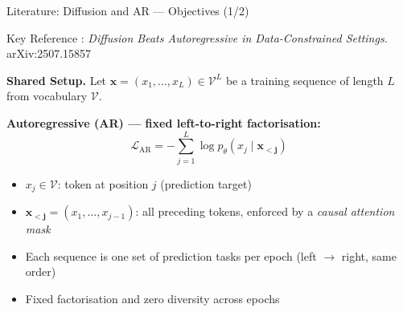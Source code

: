 \documentclass[aspectratio=169,10pt]{beamer}
\begin{document}
\begin{frame}{Literature: Diffusion and AR — Objectives (1/2)}
  \begin{block}{Key Reference}
    \citet{prabhudesai2025diffusion}:
    \emph{Diffusion Beats Autoregressive in Data-Constrained Settings.}
    arXiv:2507.15857
  \end{block}
  \vspace{0.4em}

  \textbf{Shared Setup.}\;
  Let $\mathbf{x} = (x_1,\ldots,x_L)\in\mathcal{V}^L$ be a training sequence
  of length $L$ from vocabulary $\mathcal{V}$.

  \vspace{0.5em}
  \textbf{Autoregressive (AR) — fixed left-to-right factorisation:}
  \[
    \mathcal{L}_{\mathrm{AR}}
      = -\sum_{j=1}^{L}\log p_\theta\!\left(x_j \mid \mathbf{x_{<j}}\right)
  \]

  \begin{itemize}
    \item $x_j\in\mathcal{V}$: token at position $j$ (prediction target)
    \item $\mathbf{x_{<j}}=(x_1,\ldots,x_{j-1})$: all preceding tokens,
          enforced by a \emph{causal attention mask}
    \item Each sequence is one set of prediction
          tasks per epoch (left $\to$ right, same order)
    \item Fixed factorisation and zero diversity across epochs
  \end{itemize}
\end{frame}
\end{document}
